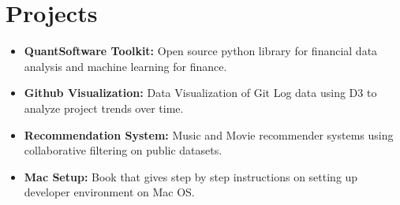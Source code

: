 \documentclass[letter,11pt]{article}
\newcommand{\resumeItem}[2]{
  \item\small{
    \textbf{#1:}{\vspace{-4pt} \noindent #2}
  }
}
\newcommand{\resumeSubItem}[2]{\resumeItem{#1}{#2}\vspace{-4pt}}
\newcommand{\resumeSubHeadingListStart}{\begin{itemize}[leftmargin=*]}
\newcommand{\resumeSubHeadingListEnd}{\end{itemize}}
\begin{document}
\section{Projects}
  \resumeSubHeadingListStart
    \resumeSubItem{QuantSoftware Toolkit}
      {Open source python library for financial data analysis and machine learning for finance.}
    \resumeSubItem{Github Visualization}
      {Data Visualization of Git Log data using D3 to analyze project trends over time.}
    \resumeSubItem{Recommendation System}
      {Music and Movie recommender systems using collaborative filtering on public datasets.}
    \resumeSubItem{Mac Setup}
      {Book that gives step by step instructions on setting up developer environment on Mac OS.}
  \resumeSubHeadingListEnd

%


\end{document}
